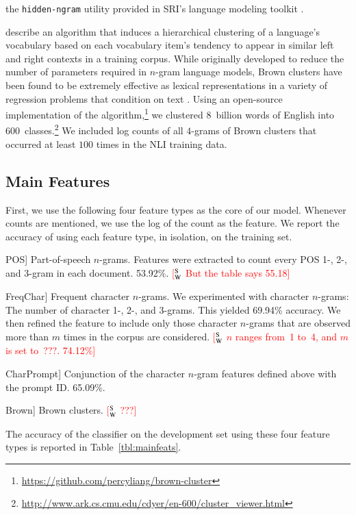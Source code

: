 \documentclass[11pt,letterpaper]{article}
\newcommand{\ensuretext}[1]{#1}
\newcommand{\swmarker}{\ensuretext{\textcolor{red}{\ensuremath{^{\textsc{S}}_{\textsc{W}}}}}}
\newcommand{\arkcomment}[3]{\ensuretext{\textcolor{#3}{[#1 #2]}}}
\newcommand{\sw}[1]{\arkcomment{\swmarker}{#1}{red}}
\newcommand{\Tref}[1]{Table~\ref{#1}}
\newcommand{\feat}[1]{\textsmaller[.5]{\textsf{#1}}} %
\begin{document}
\begin{compactdesc}
  the \texttt{hidden-ngram} utility provided in SRI's language modeling toolkit
  \citep{stolcke02srilm}.
\item[Brown clusters] \cite{brown:cl1992} describe an algorithm that induces a hierarchical clustering of a language's vocabulary based on each vocabulary item's tendency to appear in similar left and right contexts in a training corpus. While originally developed to reduce the number of parameters required in $n$-gram language models, Brown clusters have been found to be extremely effective as lexical representations in a variety of regression problems that condition on text \citep{koo:2008,turian:acl2010,owoputi:2013}.  Using an open-source implementation of the algorithm,\footnote{\url{https://github.com/percyliang/brown-cluster}} we clustered 8~billion words of English into 600~classes.\footnote{\url{http://www.ark.cs.cmu.edu/cdyer/en-600/cluster_viewer.html}}  We included log counts of all $4$-grams of Brown clusters that occurred at least $100$ times in the NLI training data.

\end{compactdesc}

\subsection{Main Features}
\label{sec:mainfeats}
First, we use the following four feature types as the core of our
model.  Whenever counts are mentioned, we use the log of the count as
the feature.  We report the accuracy of using each feature type, in
isolation, on the training set.

\begin{compactdesc}
\item[\feat{POS}] Part-of-speech $n$-grams.  Features were extracted
  to count every POS 1-, 2-, and 3-gram in each
  document. 53.92\%. \sw{But the table says 55.18}
\item[\feat{FreqChar}] Frequent character $n$-grams.  We experimented
  with character $n$-grams: The number of character 1-, 2-, and
  3-grams. This yielded 69.94\% accuracy.  We then refined the feature
  to include only those character $n$-grams that are observed more
  than $m$ times in the corpus are considered. \sw{$n$ ranges from~1
    to~4, and $m$ is set to~???. 74.12\%}
\item[\feat{CharPrompt}] Conjunction of the character $n$-gram
  features defined above with the prompt ID. 65.09\%.
\item[\feat{Brown}] Brown clusters. \sw{???}
\end{compactdesc}
\noindent
The accuracy of the classifier on the development set using these four
feature types is reported in \Tref{tbl:mainfeats}.
\end{document}
